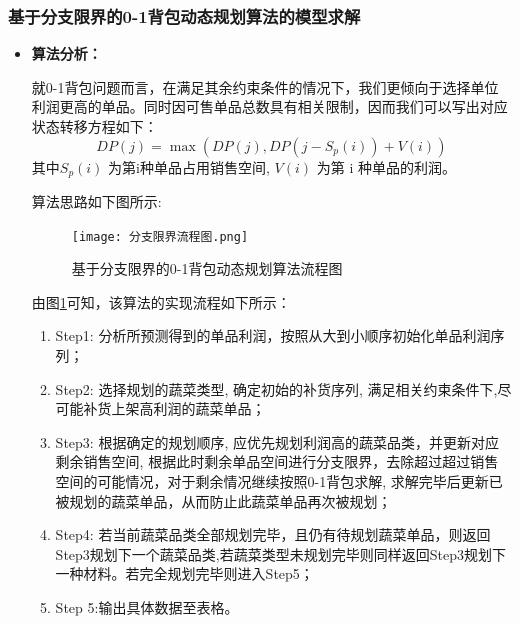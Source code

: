 \documentclass{my_paper}
\begin{document}
\subsubsection{基于分支限界的0-1背包动态规划算法的模型求解}
\begin{itemize}
    \item \textbf{算法分析：}\par
\hspace{2em}就0-1背包问题而言，在满足其余约束条件的情况下，我们更倾向于选择单位利润更高的单品。同时因可售单品总数具有相关限制，因而我们可以写出对应状态转移方程如下：
\begin{equation}
DP(j)=\max (DP(j), DP(j-S_p(i))+V(i))
\end{equation}
其中$S_p(i)$ 为第$\mathrm{i}$种单品占用销售空间, $V(i)$ 为第 $\mathrm{i}$ 种单品的利润。\par
算法思路如下图所示:
\begin{figure}[H]
 \centering
 \texttt{[image: 分支限界流程图.png]} 
 \caption{基于分支限界的0-1背包动态规划算法流程图} %
 \label{基于分支限界的0-1背包动态规划算法} 
\end{figure}\par
由图\ref{基于分支限界的0-1背包动态规划算法}可知，该算法的实现流程如下所示：
\begin{enumerate}
    \item Step1: 分析所预测得到的单品利润，按照从大到小顺序初始化单品利润序列；\par
    \item Step2: 选择规划的蔬菜类型, 确定初始的补货序列, 满足相关约束条件下,尽可能补货上架高利润的蔬菜单品；
    \item Step3: 根据确定的规划顺序, 应优先规划利润高的蔬菜品类，并更新对应剩余销售空间, 根据此时剩余单品空间进行分支限界，去除超过超过销售空间的可能情况，对于剩余情况继续按照0-1背包求解, 求解完毕后更新已被规划的蔬菜单品，从而防止此蔬菜单品再次被规划；\par
    \item Step4: 若当前蔬菜品类全部规划完毕，且仍有待规划蔬菜单品，则返回 Step3规划下一个蔬菜品类,若蔬菜类型未规划完毕则同样返回Step3规划下一种材料。若完全规划完毕则进入Step5；\par
    \item Step 5:输出具体数据至表格。
\end{enumerate}


\end{itemize}
\end{document}
